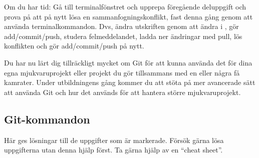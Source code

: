 \begin{Datorarbete}
	\item Om du har tid: Gå till terminalfönstret och upprepa föregående deluppgift och prova på att på nytt lösa en sammanfogningskonflikt, fast denna gång genom att använda terminalkommandon. Dvs, ändra utskriften genom att ändra  i , gör add/commit/push, studera felmeddelandet, ladda ner ändringar med pull, lös konflikten och gör add/commit/push på nytt.


\end{Datorarbete}


Du har nu lärt dig tillräckligt mycket om Git för att kunna använda det för dina egna mjukvaruprojekt eller projekt du gör tillsammans med en eller några få kamrater. Under utbildningens gång kommer du att stöta på mer avancerade sätt att använda Git och hur det används för att hantera större mjukvaruprojekt.




\newpage

\subsection*{Git-kommandon}
Här ges lösningar till de uppgifter som är markerade. Försök gärna lösa uppgifterna utan denna hjälp först. Ta gärna hjälp av en ``cheat sheet''.


